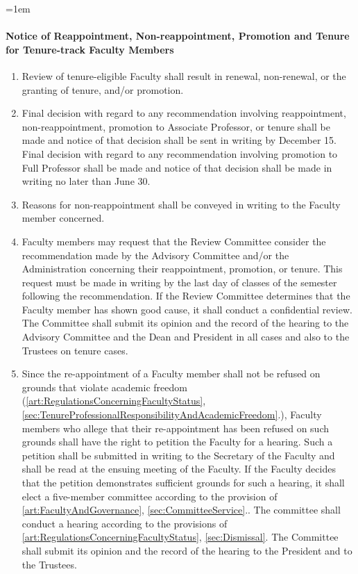 \documentclass{manual}
\let\oldparagraph\paragraph
\renewcommand\paragraph{\leftskip=1em\oldparagraph}
\newcommand{\itemLevelA}{\alph*.}
\newcommand{\itemRefA}{\alph*}
\begin{document}
\paragraph{Notice of Reappointment, Non-reappointment, Promotion and Tenure for Tenure-track Faculty Members}

\begin{enumerate}[label=\itemLevelA,ref=\itemRefA]

\item Review of tenure-eligible Faculty shall result in renewal, non-renewal, or the granting of tenure, and/or promotion.

\item Final decision with regard to any recommendation involving reappointment, non-reappointment, promotion to Associate Professor, or tenure shall be made and notice of that decision shall be sent in writing by December 15. Final decision with regard to any recommendation involving promotion to Full Professor shall be made and notice of that decision shall be made in writing no later than June 30. 

\item Reasons for non-reappointment shall be conveyed in writing to the Faculty member concerned.

\item Faculty members may request that the Review Committee consider the recommendation made by the Advisory Committee and/or the Administration concerning their reappointment, promotion, or tenure. This request must be made in writing by the last day of classes of the semester following the recommendation. If the Review Committee determines that the Faculty member has shown good cause, it shall conduct a confidential review. The Committee shall submit its opinion and the record of the hearing to the Advisory Committee and the Dean and President in all cases and also to the Trustees on tenure cases.


\item Since the re-appointment of a Faculty member shall not be refused on grounds that violate academic freedom (\cref{art:RegulationsConcerningFacultyStatus}, \cref{sec:TenureProfessionalResponsibilityAndAcademicFreedom}.), Faculty members who allege that their re-appointment has been refused on such grounds shall have the right to petition the Faculty for a hearing. Such a petition shall be submitted in writing to the Secretary of the Faculty and shall be read at the ensuing meeting of the Faculty. If the Faculty decides that the petition demonstrates sufficient grounds for such a hearing, it shall elect a five-member committee according to the provision of \cref{art:FacultyAndGovernance}, \cref{sec:CommitteeService}.. The committee shall conduct a hearing according to the provisions of \cref{art:RegulationsConcerningFacultyStatus}, \cref{sec:Dismissal}. The Committee shall submit its opinion and the record of the hearing to the President and to the Trustees.
\end{enumerate}
\end{document}
